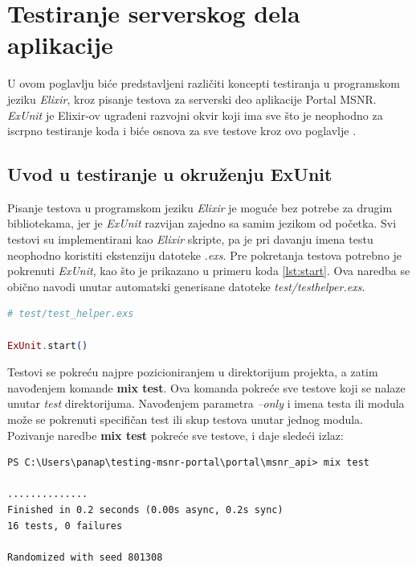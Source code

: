 \documentclass[12pt,oneside]{memoir}
\begin{document}
\chapter{Testiranje serverskog dela aplikacije}
\label{chp:elixir}

\par U ovom poglavlju biće predstavljeni različiti koncepti testiranja u programskom jeziku \emph{Elixir}, kroz pisanje testova za serverski deo aplikacije Portal MSNR. \textit{ExUnit} je Elixir-ov ugrađeni razvojni okvir koji ima sve što je neophodno za iscrpno testiranje koda i biće osnova za sve testove kroz ovo poglavlje \cite{exunit}.

\section{Uvod u testiranje u okruženju ExUnit}
\label{sec:elixunit}

\par Pisanje testova u programskom jeziku \emph{Elixir} je moguće bez potrebe za drugim bibliotekama, jer je \emph{ExUnit} razvijan zajedno sa samim jezikom od početka. Svi testovi su implementirani kao \emph{Elixir} skripte, pa je pri davanju imena testu neophodno koristiti ekstenziju datoteke \emph{.exs}. Pre pokretanja testova potrebno je pokrenuti \emph{ExUnit}, kao što je prikazano u primeru koda \ref{lst:start}. Ova naredba se obično navodi unutar automatski generisane datoteke \emph{test/test{\textunderscore}helper.exs}. 

\begin{lstlisting}[language=elixir, caption={Pokretanje ExUnit},captionpos=b, label={lst:start}]
# test/test_helper.exs

ExUnit.start()
\end{lstlisting}

\par Testovi se pokreću najpre pozicioniranjem u direktorijum projekta, a zatim navođenjem komande \textbf{mix test}. Ova komanda pokreće sve testove koji se nalaze unutar \emph{test} direktorijuma. Navođenjem parametra \emph{--only} i imena testa ili modula može se pokrenuti specifičan test ili skup testova unutar jednog modula. Pozivanje naredbe \textbf{mix test } pokreće sve testove, i daje sledeći izlaz:  

\begin{lstlisting}[style=DOS]
PS C:\Users\panap\testing-msnr-portal\portal\msnr_api> mix test

..............
Finished in 0.2 seconds (0.00s async, 0.2s sync)
16 tests, 0 failures

Randomized with seed 801308
\end{lstlisting}
\end{document}
